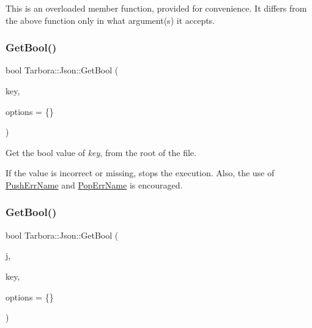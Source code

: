 This is an overloaded member function, provided for convenience. It differs from the above function only in what argument(s) it accepts. \mbox{\label{classTarbora_1_1Json_a5ab7c5155726e886ccba57c8b0ed9a64}} 
\subsubsection{\texorpdfstring{Get\+Bool()}{GetBool()}\hspace{0.1cm}{\footnotesize\ttfamily [1/3]}}
{\footnotesize\ttfamily bool Tarbora\+::\+Json\+::\+Get\+Bool (\begin{DoxyParamCaption}\item[{const char $\ast$}]{key,  }\item[{\hyperlink{structTarbora_1_1JsonOptions}{Json\+Options}}]{options = {\ttfamily \{\}} }\end{DoxyParamCaption})}



Get the bool value of {\itshape key}, from the root of the file. 

If the value is incorrect or missing, stops the execution. Also, the use of \hyperlink{classTarbora_1_1Json_a061eac4f16dac3b9b3a26a66de0ea8f0}{Push\+Err\+Name} and \hyperlink{classTarbora_1_1Json_a14019f06d3bd76edd6a6e78134519d11}{Pop\+Err\+Name} is encouraged. \mbox{\label{classTarbora_1_1Json_aafdb382885bafbe2b00da49dc685ab25}} 
\subsubsection{\texorpdfstring{Get\+Bool()}{GetBool()}\hspace{0.1cm}{\footnotesize\ttfamily [2/3]}}
{\footnotesize\ttfamily bool Tarbora\+::\+Json\+::\+Get\+Bool (\begin{DoxyParamCaption}\item[{raw\+\_\+json}]{j,  }\item[{const char $\ast$}]{key,  }\item[{\hyperlink{structTarbora_1_1JsonOptions}{Json\+Options}}]{options = {\ttfamily \{\}} }\end{DoxyParamCaption})}



